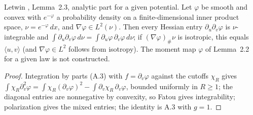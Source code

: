 \begin{lemma}
  \label{lem:letwin-mean-hessian}
  \leanok
  Letwin \cite{Letwin2026QuadraticKLS}, Lemma~2.3, analytic part for a given potential. Let
  $\varphi$ be smooth and convex with $e^{-\varphi}$ a probability density on a finite-dimensional
  inner product space, $\nu=e^{-\varphi}\,dx$, and $\nabla\varphi\in L^2(\nu)$. Then every Hessian
  entry $\partial_u\partial_v\varphi$ is $\nu$-integrable and
  $\int\partial_u\partial_v\varphi\,d\nu=\int\partial_u\varphi\,\partial_v\varphi\,d\nu$; if
  $(\nabla\varphi)_\#\nu$ is isotropic, this equals $\langle u,v\rangle$ (and
  $\nabla\varphi\in L^2$ follows from isotropy). The moment map $\varphi$ of Lemma~2.2 for a given
  law is not constructed.
\end{lemma}
\begin{proof}
  \leanok
  Integration by parts (A.3) with $f=\partial_v\varphi$ against the cutoffs $\chi_R$ gives
  $\int\chi_R\partial_v^2\varphi=\int\chi_R(\partial_v\varphi)^2-\int\partial_v\chi_R\,\partial_v\varphi$,
  bounded uniformly in $R\ge1$; the diagonal entries are nonnegative by convexity, so Fatou gives
  integrability; polarization gives the mixed entries; the identity is A.3 with $g=1$.
\end{proof}

